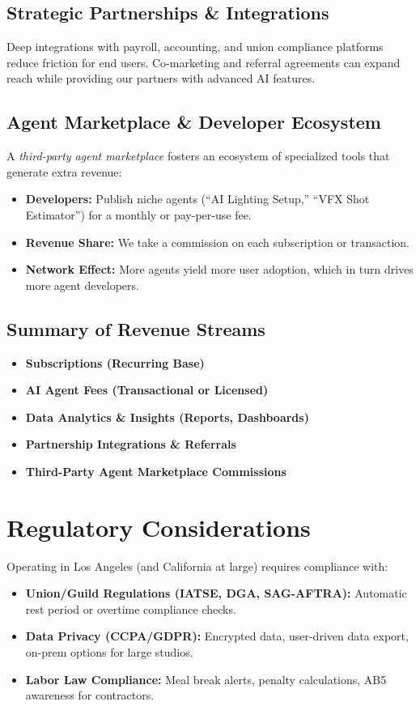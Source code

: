 \documentclass[11pt]{article}
\begin{document}
\subsection{Strategic Partnerships \& Integrations}
Deep integrations with payroll, accounting, and union compliance platforms reduce friction for end users. Co-marketing and referral agreements can expand reach while providing our partners with advanced AI features.

\subsection{Agent Marketplace \& Developer Ecosystem}
A \emph{third-party agent marketplace} fosters an ecosystem of specialized tools that generate extra revenue:
\begin{itemize}
    \item \textbf{Developers:} Publish niche agents (“AI Lighting Setup,” “VFX Shot Estimator”) for a monthly or pay-per-use fee.
    \item \textbf{Revenue Share:} We take a commission on each subscription or transaction.
    \item \textbf{Network Effect:} More agents yield more user adoption, which in turn drives more agent developers.
\end{itemize}

\subsection{Summary of Revenue Streams}
\begin{itemize}
    \item \textbf{Subscriptions (Recurring Base)}
    \item \textbf{AI Agent Fees (Transactional or Licensed)}
    \item \textbf{Data Analytics \& Insights (Reports, Dashboards)}
    \item \textbf{Partnership Integrations \& Referrals}
    \item \textbf{Third-Party Agent Marketplace Commissions}
\end{itemize}

\section{Regulatory Considerations}
Operating in Los Angeles (and California at large) requires compliance with:
\begin{itemize}
    \item \textbf{Union/Guild Regulations (IATSE, DGA, SAG-AFTRA):} Automatic rest period or overtime compliance checks.
    \item \textbf{Data Privacy (CCPA/GDPR):} Encrypted data, user-driven data export, on-prem options for large studios.
    \item \textbf{Labor Law Compliance:} Meal break alerts, penalty calculations, AB5 awareness for contractors.
\end{itemize}
\end{document}
